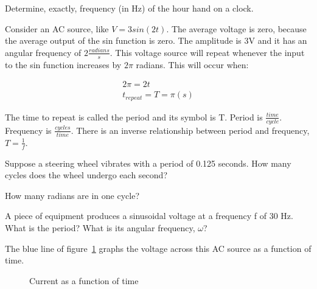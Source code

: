 \begin{blevel}
Determine, exactly, frequency (in Hz) of the hour hand on a clock.
\end{blevel}

Consider an AC source, like $V=3sin(2t)$. The average voltage is zero, because the average output of the sin function is zero. The amplitude is 3V and it has an angular frequency of $2 \frac{radians}{s}$. This voltage source will repeat whenever the input to the sin function increases by $2\pi$ radians. This will occur when:\par

\begin{align*}
2\pi=2t\\
t_{repeat}=T=\pi(s)
\end{align*}

The time to repeat is called the period and its symbol is T. Period is $\frac{time}{cycle}$. Frequency is $\frac{cycles}{time}$. There is an inverse relationship between period and frequency, $T = \frac{1}{f}$.

\begin{blevel}
Suppose a steering wheel vibrates with a period of 0.125 seconds. How many cycles does the wheel undergo each second? 
\end{blevel}

\begin{alevel}
How many radians are in one cycle?
\end{alevel}

\begin{blevel}
A piece of equipment produces a sinusoidal voltage at a frequency f of 30 Hz. What is the period? What is its angular frequency, $\omega$?
\end{blevel}

The blue line of figure~\ref{F:8PHASE} graphs the voltage across this AC source as a function of time.

\begin{figure}[H]
\begin{center}
\caption{Current as a function of time}
\label{F:8PHASE}
\end{center}
\end{figure}

